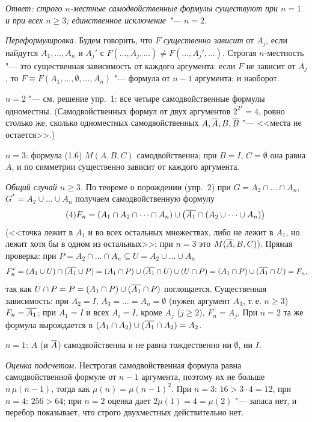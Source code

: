 \begin{solution}[4 (\S\,3)]
\emph{Ответ: строго $n$-местные самодвойственные формулы существуют при
$n=1$ и при всех $n\ge3$; единственное исключение "--- $n=2$.}

\emph{Переформулировка.} Будем говорить, что $F$ \emph{существенно
зависит} от $A_j$, если найдутся $A_1,\dots,A_n$ и $A_j'$ с
$F(\dots,A_j,\dots)\ne F(\dots,A_j',\dots)$. Строгая $n$-местность "---
это существенная зависимость от каждого аргумента: если $F$ не зависит
от $A_j$, то $F\equiv F(A_1,\dots,\emptyset,\dots,A_n)$ "--- формула от
$n-1$ аргумента; и наоборот.

\emph{$n=2$} "--- см. решение упр.~1: все четыре самодвойственные формулы
одноместны. (Самодвойственных формул от двух аргументов $2^{2^1}=4$, ровно
столько же, сколько одноместных самодвойственных $A,\overline{A},B,\overline{B}$ "---
<<места не остается>>.)

\emph{$n=3$}: формула (1.6) $M(A,B,C)$ самодвойственна; при $B=I$,
$C=\emptyset$ она равна $A$, и по симметрии существенно зависит от
каждого аргумента.

\emph{Общий случай $n\ge3$.} По теореме о порождении (упр.~2) при
$G=A_2\cap\dots\cap A_n$, $G^*=A_2\cup\dots\cup A_n$ получаем
самодвойственную формулу
\begin{equation*}\tag{4}
F_n=(A_1\cap A_2\cap\dots\cap A_n)\cup\bigl(\overline{A_1}\cap(A_2\cup\dots\cup A_n)\bigr)
\end{equation*}
(<<точка лежит в $A_1$ и во всех остальных множествах, либо не лежит в
$A_1$, но лежит хотя бы в одном из остальных>>; при $n=3$ это
$M(\overline{A},B,C)$). Прямая проверка: при $P=A_2\cap\dots\cap A_n\subseteq U=A_2\cup\dots\cup A_n$
\[
F_n^*=(A_1\cup U)\cap(\overline{A_1}\cup P)=(A_1\cap P)\cup(\overline{A_1}\cap U)\cup(U\cap P)
=(A_1\cap P)\cup(\overline{A_1}\cap U)=F_n,
\]
так как $U\cap P=P=(A_1\cap P)\cup(\overline{A_1}\cap P)$ поглощается.
Существенная зависимость: при $A_2=I$, $A_3=\dots=A_n=\emptyset$ (нужен
аргумент $A_3$, т.\,е. $n\ge3$) $F_n=\overline{A_1}$; при $A_1=I$ и всех
$A_i=I$, кроме $A_j$ ($j\ge2$), $F_n=A_j$. При $n=2$ та же формула
вырождается в $(A_1\cap A_2)\cup(\overline{A_1}\cap A_2)=A_2$.

\emph{$n=1$}: $A$ (и $\overline{A}$) самодвойственна и не равна тождественно ни
$\emptyset$, ни $I$.

\emph{Оценка подсчетом.} Нестрогая самодвойственная формула равна самодвойственной формуле от
$n-1$ аргумента, поэтому их не больше $n\,\mu(n-1)$, тогда как
$\mu(n)=\mu(n-1)^2$. При $n=3$: $16>3\cdot4=12$, при $n=4$: $256>64$;
при $n=2$ оценка дает $2\mu(1)=4=\mu(2)$ "--- запаса нет, и перебор
показывает, что строго двухместных действительно нет.
\end{solution}

